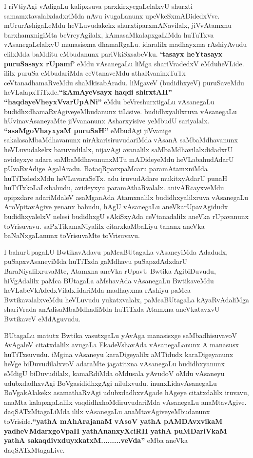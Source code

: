 \begin{artha}
I riVtiyAgi vAdigaLu kalipxsuva parxkirxyegaLelalxvU shurxti
samamxtavalalxdadxriMda nAvu ivugaLanunx
upeVkeSxmADidedxVve. mUrurAshigaLeMdu heVLuvudakekx
 shurxtiparxmANavilalx, jiVvAtamxnu barxhamxnigiMta beVreyAgilalx,
kAmasaMkalapxgaLiMda  huTuTxva vAsanegaLelalxvU manasisxna dhamaRgaLu.
idaralilx madhayxma rAshiyAvudu elilxMda baMditu eMbudanunx
pariVkiSxsabeVku. \textbf{`tasayx heYtasayx puruSasayx rUpamf'} eMdu vAsanegaLu liMga shariVradedxV
eMduheVLide. ililx puruSa eMbudariMda ceVtanaveMdu athaRvaninxTuTx
ceVtanadhamaRveMdu shaMkisabAradu. liMgaveV (budidhxyeV) puruSaveMdu
heVLalapxTiTxde.\textbf{``kAmAyeV\s sayx haqdi shirxtAH'' ``haqdayeVheyxVvarUpANi''} eMdu  beVreshurxtigaLu
vAsanegaLu budidhxdhamaRvAgiveyeMbudanunx
tiLisive. budidhxyalilxruva vAsanegaLu hUvinavAsaneyaMte jiVvananunx
Asharxyisive yeMbudU sariyalalx. \textbf{``asaMgoVhayxyaM puruSaH''} eMbudAgi jiVvanige
sakalasaMbaMdhavanunx nirAkarisiruvudariMda vAsanA saMbaMdhavanunx
heVLuvudakekx baruvudilalx, nijavAgi avanalilx saMbaMdhavilalxdidadxrU
avideyxye adara saMbaMdhavanunxMTu mADideyeMdu heVLabahudAdarU
pUvaRvAdige AgalAradu. BataqRparxpaMcaru paramAtamxniMda
huTiTxdedxMdu heVLuvaraSeTx. adu iruvudAdare mukitxyAdarU punaH
huTiTxkoLaLxbahudu, avideyxyu paramAthaRvalalx. anivARcayxveMdu
opipxdare adariMdaleV asaMganAda Atamxnalilx budidhxyalilxruva
vAsanegaLu AroVpitavAgive yenanx bahudu, hAgU vAsanegaLu
aneVkarUpavAgidudx budidhxyalelxV nelesi budidhxgU sAkiSxyAda
ceVtanadalilx aneVka rUpavanunx toVrisuvavu. saPxTikamaNiyalilx
citarxkaMbaLiyu tananx aneVka baNaNxgaLanunx toVrisuvaMte toVrisuvavu.
\end{artha}

\begin{artha}
I bahurUpagaLU BwtikavAdavu paMcaBUtagaLa vAsaneyiMda Adadudx,
puSapxvAsaneyiMda huTiTxda gaMdhavu puSapxdAdxdarU
BaraNiyalilxruvaMte, Atamxna aneVka rUpavU Bwtika AgibiDuvudu,
hiVgAdalilx paMca BUtagaLa aMshavAda vAsanegaLu BwtikaveMdu
heVLabeVkAdedxVilalx.idariMda madhayxma rAshiyu paMca BwtikavalalxveMdu
heVLuvudu yukatxvalalx, paMcaBUtagaLa kAyaRvAda\break liMga  shariVrada
anAdisaMbaMdhadiMda huTiTxda Atamxna aneVkatavxvU BwtikaveV eMdAguvudu.
\end{artha}

\centerline{}

\begin{artha}
BUtagaLu matutx Bwtika vasutxgaLu yAvAga manasisxge saMbadhisuvavoV
AvAgaleV citatxdalilx avugaLa EkadeVshavAda vAsanegaLanunx A manasusx
huTiTxsuvudu. iMgina vAsaneyu karaDigeyalilx aMTidudx karaDigeyanunx
heVge biDuvudilalxvoV adaraMte jagatitxna vAsanegaLu budidhxyanunx
eMdigU biDuvudilalx, kamaRdiMda oMdusala yAvudoV oMdu vAsaneyu
udubxdadhxvAgi BoVgasididhxgAgi  nilulxvudu. inunxLidavAsanegaLu
BoVgakAlakekx asamathaRvAgi udubxdadhxvAgade hAgeye citatxdalilx
iruvavu, anaMta kalapxgaLalilx vaqdidhxhoMdiruvudariMda vAsanegaLu
anaMtavAgive. daqSATxMtagaLiMda ililx vAsanegaLu
anaMtavAgiveyeMbudanunx toVriside.\textbf{``yathA mAhArajanaM vAsoV yathA pAMDAvxvikaM yadheVMdarxgoVpaH yathAnanxyXciRH yathA puMDariVkaM yathA sakaqdivxduyxkatxM.........veVda''} eMba aneVka
daqSATxMtagaLive.
\end{artha}


